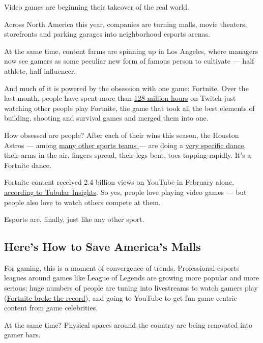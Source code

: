 Video games are beginning their takeover of the real world.

Across North America this year, companies are turning malls, movie
theaters, storefronts and parking garages into neighborhood esports
arenas.

At the same time, content farms are spinning up in Los Angeles, where
managers now see gamers as some peculiar new form of famous person to
cultivate --- half athlete, half influencer.

And much of it is powered by the obsession with one game: Fortnite. Over
the last month, people have spent more than
\href{https://sullygnome.com/game/Fortnite/30/summary}{128 million
hours} on Twitch just watching other people play Fortnite, the game that
took all the best elements of building, shooting and survival games and
merged them into one.

How obsessed are people? After each of their wins this season, the
Houston Astros --- among
\href{https://www.sbnation.com/lookit/2018/3/11/17106330/fortnite-sports-celebrations-bundesliga-nrl-nba-nfl}{many
other sports teams }--- are doing a
\href{https://www.youtube.com/watch?v=q2V_58xws9g}{very specific dance},
their arms in the air, fingers spread, their legs bent, toes tapping
rapidly. It's a Fortnite dance.

Fortnite content received 2.4 billion views on YouTube in February
alone, \href{http://tubularinsights.com/top-fortnite-videos/}{according
to Tubular Insights}. So yes, people love playing video games --- but
people also love to watch others compete at them.

Esports are, finally, just like any other sport.

\hypertarget{heres-how-to-save-americas-malls}{%
\subsection{Here's How to Save America's
Malls}\label{heres-how-to-save-americas-malls}}

For gaming, this is a moment of convergence of trends. Professional
esports leagues around games like League of Legends are growing more
popular and more serious; huge numbers of people are tuning into
livestreams to watch gamers play
(\href{https://www.engadget.com/2018/03/26/fortnite-smashed-youtube-viewing-records/}{Fortnite
broke the record}), and going to YouTube to get fun game-centric content
from game celebrities.

At the same time? Physical spaces around the country are being renovated
into gamer bars.

